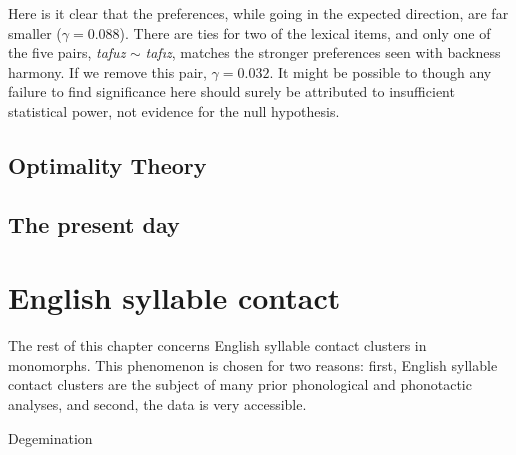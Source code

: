 Here is it clear that the preferences, while going in the expected direction, are far smaller ($\gamma = 0.088$). There are ties for two of the lexical items, and only one of the five pairs, \emph{tafuz} $\sim$ \emph{taf\i z}, matches the stronger preferences seen with backness harmony. If we remove this pair, $\gamma = 0.032$.  It might be possible to though any failure to find significance here should surely be attributed to insufficient statistical power, not evidence for the null hypothesis. 




\subsection{Optimality Theory}

\subsection{The present day}

\section{English syllable contact}

The rest of this chapter concerns English syllable contact clusters in monomorphs. This phenomenon is chosen for two reasons: first, English syllable contact clusters are the subject of many prior phonological and phonotactic analyses, and second, the data is very accessible.


Degemination

\citet[][20]{Harris1994}

